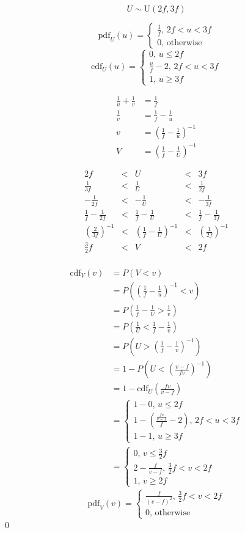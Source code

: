 \documentclass[a4paper]{article}
\begin{document}
\[U\sim\mathrm U(2f,3f)\]

\[\mathrm{pdf}_U(u)=\begin{cases}\frac1f,\,2f<u<3f\\0,\,\text{otherwise}\end{cases}\]
\[\mathrm{cdf}_U(u)=\begin{cases}0,\,u\leqslant2f\\\frac uf-2,\,2f<u<3f\\1,\,u\geqslant3f\end{cases}\]

\[\begin{aligned}
	\frac1u+\frac1v&=\frac1f\\
	\frac1v&=\frac1f-\frac1u\\
	v&=\left(\frac1f-\frac1u\right)^{-1}\\
	V&=\left(\frac1f-\frac1U\right)^{-1}
\end{aligned}\]

\[\begin{array}{ccccc}
	2f&<&U&<&3f\\
	\frac1{3f}&<&\frac1U&<&\frac1{2f}\\
	-\frac1{2f}&<&-\frac1U&<&-\frac1{3f}\\
	\frac1f-\frac1{2f}&<&\frac1f-\frac1U&<&\frac1f-\frac1{3f}\\
	\left(\frac2{3f}\right)^{-1}&<&\left(\frac1f-\frac1U\right)^{-1}&<&\left(\frac1{2f}\right)^{-1}\\
	\frac32f&<&V&<&2f\\
\end{array}\]

\[\begin{aligned}
	\mathrm{cdf}_V(v)&=P(V<v)\\
			 &=P\left(\left(\frac1f-\frac1u\right)^{-1}<v\right)\\
			 &=P\left(\frac1f-\frac1U>\frac1v\right)\\
			 &=P\left(\frac1U<\frac1f-\frac1v\right)\\
			 &=P\left(U>\left(\frac1f-\frac1v\right)^{-1}\right)\\
			 &=1-P\left(U<\left(\frac{v-f}{fv}\right)^{-1}\right)\\
			 &=1-\mathrm{cdf}_U\left(\frac{fv}{v-f}\right)\\
			 &=\begin{cases}1-0,\,u\leqslant2f\\1-\left(\frac{\frac{fv}{v-f}}f-2\right),\,2f<u<3f\\1-1,\,u\geqslant3f\end{cases}\\
			 &=\begin{cases}0,\,v\leqslant\frac32f\\2-\frac f{v-f},\,\frac32f<v<2f\\1,\,v\geqslant2f\end{cases}
\end{aligned}\]
\[\mathrm{pdf}_V(v)=\begin{cases}\frac f{(v-f)^2},\,\frac32f<v<2f\\0,\,\text{otherwise}\end{cases}\]\qed
\end{document}

